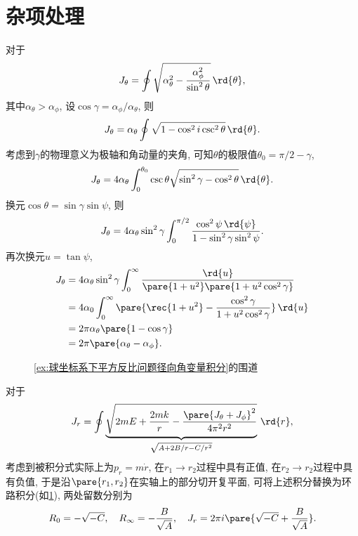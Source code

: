 \documentclass[../TheoreticalMechanics.tex]{subfiles}
\begin{document}
\section{杂项处理} %
\label{sec:杂项处理}

\begin{ex}
    \label{ex:球坐标系下平方反比问题角向角变量积分}
    对于
    \[ J_\theta = \oint\sqrt{\alpha_\theta^2 - \frac{\alpha_\phi^2}{\sin^2\theta}}\,\rd{\theta}, \]
    其中$\alpha_\theta > \alpha_\phi$, 设$\cos\gamma = \alpha_\phi/\alpha_\theta$, 则
    \[ J_\theta = \alpha_\theta\oint \sqrt{1-\cos^2 i \csc^2\theta}\,\rd{\theta}. \]
    考虑到$\gamma$的物理意义为极轴和角动量的夹角, 可知$\theta$的极限值$\theta_0 = \pi/2 - \gamma$,
    \[ J_\theta = 4\alpha_\theta \int_0^{\theta_0}\csc\theta\sqrt{\sin^2\gamma - \cos^2\theta}\,\rd{\theta}. \]
    换元$\cos\theta = \sin\gamma\sin\psi$, 则
    \[ J_\theta = 4\alpha_\theta\sin^2\gamma\int_0^{\pi/2}\frac{\cos^2\psi\,\rd{\psi}}{1-\sin^2\gamma\sin^2\psi}. \]
    再次换元$u=\tan\psi$,
    \begin{align*}
        J_\theta &= 4\alpha_\theta \sin^2\gamma \int_0^\infty \frac{\rd{u}}{\pare{1+u^2}\pare{1+u^2\cos^2\gamma}} \\
        &= 4\alpha_0 \int_0^\infty\pare{\rec{1+u^2} - \frac{\cos^2\gamma}{1+u^2\cos^2\gamma}}\,\rd{u} \\
        &= 2\pi\alpha_\theta\pare{1-\cos \gamma} \\
        &= 2\pi\pare{\alpha_\theta - \alpha_\phi}.
    \end{align*}
\end{ex}
\begin{figure}[ht]
    \centering
    \caption{\cref{ex:球坐标系下平方反比问题径向角变量积分}的围道}
    \label{fig:球坐标系下平方反比问题径向角变量积分的围道}
\end{figure}
\begin{ex}
    \label{ex:球坐标系下平方反比问题径向角变量积分}
    对于
    \[ J_r = \oint \underbrace{\sqrt{2mE + \frac{2mk}{r} - \frac{\pare{J_\theta + J_\phi}^2}{4\pi^2r^2}}}_{\sqrt{A+2B/r-C/r^2}}\,\rd{r}, \]
    考虑到被积分式实际上为$p_r = m\dot{r}$, 在$r_1\rightarrow r_2$过程中具有正值, 在$r_2\rightarrow r_2$过程中具有负值, 于是沿$\pare{r_1,r_2}$在实轴上的部分切开复平面, 可将上述积分替换为环路积分(如\cref{fig:球坐标系下平方反比问题径向角变量积分的围道}), 两处留数分别为
    \[ R_0 = -\sqrt{-C},\quad R_\infty = -\frac{B}{\sqrt{A}},\quad J_r = 2\pi i\pare{\sqrt{-C}+\frac{B}{\sqrt{A}}}. \]
\end{ex}
\end{document}
